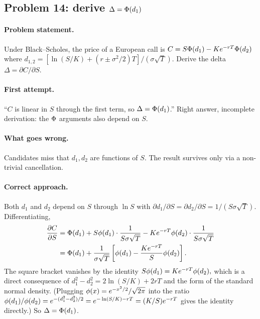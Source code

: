 \subsection{Problem 14: derive $\Delta = \Phi(d_1)$}
\label{sec:deltad1}

\paragraph{Problem statement.}
Under Black--Scholes, the price of a European call is
$C = S \Phi(d_1) - K e^{-rT} \Phi(d_2)$ where
$d_{1,2} = [\ln(S/K) + (r \pm \sigma^2/2) T] / (\sigma \sqrt T)$.
Derive the delta $\Delta = \partial C / \partial S$.

\paragraph{First attempt.}
``$C$ is linear in $S$ through the first term, so
$\Delta = \Phi(d_1)$.''  Right answer, incomplete derivation:
the $\Phi$ arguments also depend on $S$.

\paragraph{What goes wrong.}
Candidates miss that $d_1, d_2$ are functions of $S$.  The result
survives only via a non-trivial cancellation.

\paragraph{Correct approach.}
Both $d_1$ and $d_2$ depend on $S$ through $\ln S$ with
$\partial d_1/\partial S = \partial d_2/\partial S = 1/(S \sigma
\sqrt T)$.  Differentiating,
\begin{align*}
\frac{\partial C}{\partial S}
&= \Phi(d_1)
+ S \phi(d_1) \cdot \frac{1}{S \sigma \sqrt T}
- K e^{-rT} \phi(d_2) \cdot \frac{1}{S \sigma \sqrt T} \\
&= \Phi(d_1) + \frac{1}{\sigma \sqrt T}
\left[\phi(d_1) - \frac{K e^{-rT}}{S} \phi(d_2) \right].
\end{align*}
The square bracket vanishes by the identity
\(
S \phi(d_1) = K e^{-rT} \phi(d_2),
\)
which is a direct consequence of
$d_1^2 - d_2^2 = 2 \ln(S/K) + 2 r T$ and the form of the
standard normal density.  (Plugging $\phi(x) = e^{-x^2/2}/\sqrt{2\pi}$
into the ratio $\phi(d_1)/\phi(d_2) = e^{-(d_1^2-d_2^2)/2}
= e^{-\ln(S/K) - rT} = (K/S) e^{-rT}$ gives the identity directly.)
So $\Delta = \Phi(d_1)$.

